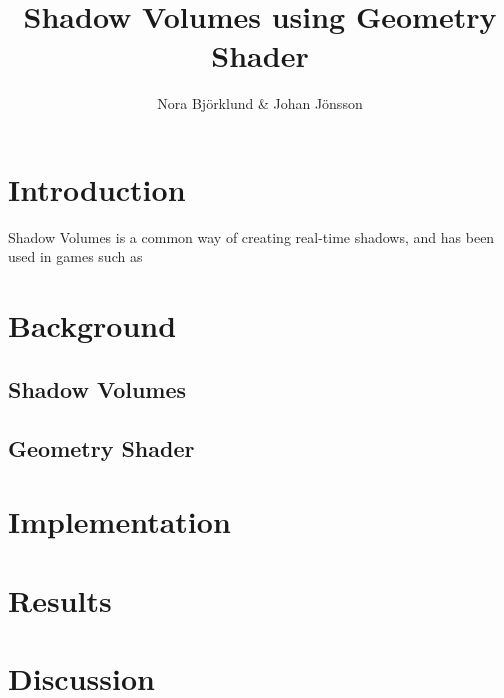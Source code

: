 \documentclass[a4paper, 12pt]{article}
\title{Shadow Volumes using Geometry Shader}
\author{Nora Björklund \& Johan Jönsson}
\begin{document}
\maketitle
\section{Introduction}
Shadow Volumes is a common way of creating real-time shadows, and has been used in games such as 
\section{Background}
\subsection{Shadow Volumes}
\subsection{Geometry Shader}
\section{Implementation}
\section{Results}
\section{Discussion }
\end{document}
